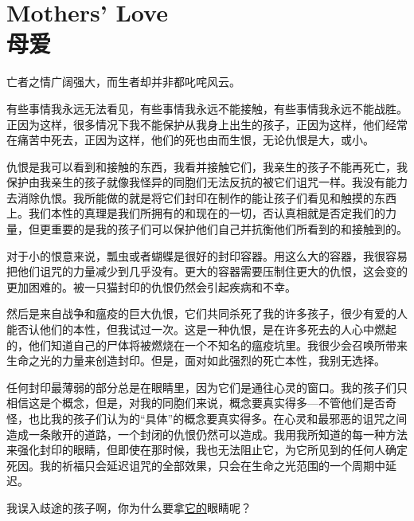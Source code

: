 \chapter[母爱]{
    Mothers' Love \\
    母爱
}

\label{chap:TAIL-mothers-love}

亡者之情广阔强大，而生者却并非都叱咤风云。

有些事情我永远无法看见，有些事情我永远不能接触，有些事情我永远不能战胜。正因为这样，很多情况下我不能保护从我身上出生的孩子，正因为这样，他们经常在痛苦中死去，正因为这样，他们的死也由而生恨，无论仇恨是大，或小。

仇恨是我可以看到和接触的东西，我看并接触它们，我亲生的孩子不能再死亡，我保护由我亲生的孩子就像我怪异的同胞们无法反抗的被它们诅咒一样。我没有能力去消除仇恨。我所能做的就是将它们封印在制作的能让孩子们看见和触摸的东西上。我们本性的真理是我们所拥有的和现在的一切，否认真相就是否定我们的力量，但更重要的是我的孩子们可以保护他们自己并抗衡他们所看到的和接触到的。

对于小的恨意来说，瓢虫或者蝴蝶是很好的封印容器。用这么大的容器，我很容易把他们诅咒的力量减少到几乎没有。更大的容器需要压制住更大的仇恨，这会变的更加困难的。被一只猫封印的仇恨仍然会引起疾病和不幸。

然后是来自战争和瘟疫的巨大仇恨，它们共同杀死了我的许多孩子，很少有爱的人能否认他们的本性，但我试过一次。这是一种仇恨，是在许多死去的人心中燃起的，他们知道自己的尸体将被燃烧在一个不知名的瘟疫坑里。我很少会召唤所带来生命之光的力量来创造封印。但是，面对如此强烈的死亡本性，我别无选择。

任何封印最薄弱的部分总是在眼睛里，因为它们是通往心灵的窗口。我的孩子们只相信这是个概念，但是，对我的同胞们来说，概念要真实得多—不管他们是否奇怪，也比我的孩子们认为的“具体”的概念要真实得多。在心灵和最邪恶的诅咒之间造成一条敞开的道路，一个封闭的仇恨仍然可以造成。我用我所知道的每一种方法来强化封印的眼睛，但即使在那时候，我也无法阻止它，为它所见到的任何人确定死因。我的祈福只会延迟诅咒的全部效果，只会在生命之光范围的一个周期中延迟。

我误入歧途的孩子啊，你为什么要拿\hyperref[chap:SCP-023]{它的}眼睛呢？
